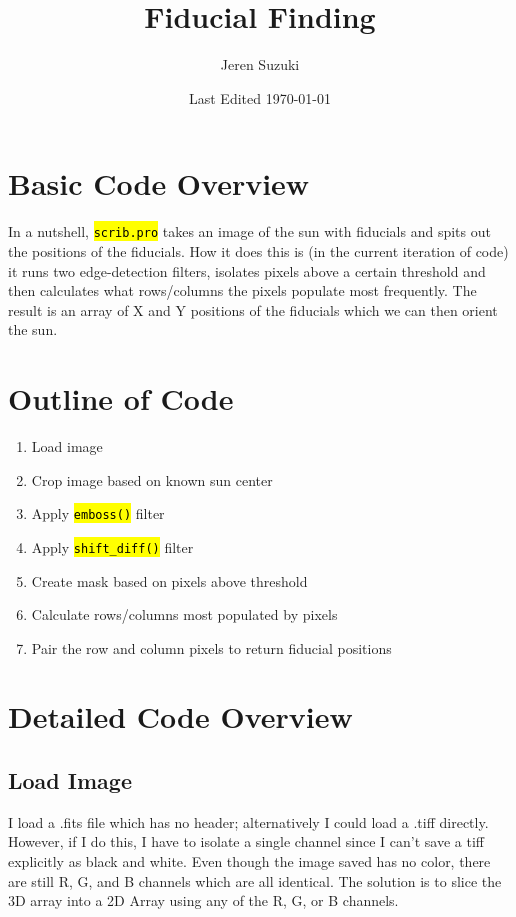 \documentclass[10pt]{article}
\title{Fiducial Finding}
\author{Jeren Suzuki}
\date{Last Edited \today}
\begin{document}
\maketitle
{}
\tableofcontents
\newpage
{}

\section{Basic Code Overview}
In a nutshell, \hl{\tt{scrib.pro}} takes an image of the sun with fiducials and spits out the positions of the fiducials. How it does this is (in the current iteration of code) it runs two edge-detection filters, isolates pixels above a certain threshold and then calculates what rows/columns the pixels populate most frequently. The result is an array of X and Y positions of the fiducials which we can then orient the sun. 

\section{Outline of Code}
\begin{enumerate}
    \item Load image
    \item Crop image based on known sun center
    \item Apply \hl{\texttt{emboss()}} filter
    \item Apply \hl{\texttt{shift\_diff()}} filter
    \item Create mask based on pixels above threshold
    \item Calculate rows/columns most populated by pixels
    \item Pair the row and column pixels to return fiducial positions
\end{enumerate}

\section{Detailed Code Overview}
    \subsection{Load Image} %
    \label{sub:load_image}
    I load a .fits file which has no header; alternatively I could load a .tiff directly. However, if I do this, I have to isolate a single channel since I can't save a tiff explicitly as black and white. Even though the image saved has no color, there are still R, G, and B channels which are all identical. The solution is to slice the 3D array into a 2D Array using any of the R, G, or B channels.
\end{document}
